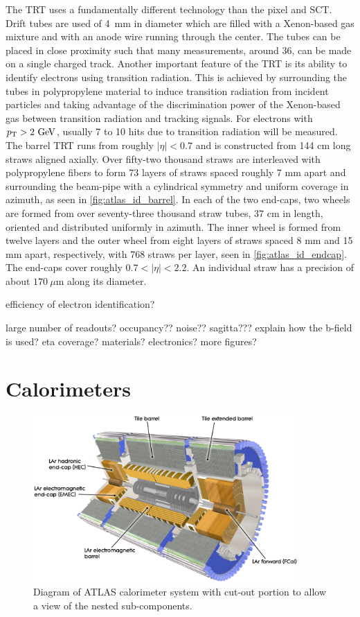 The TRT uses a fundamentally different technology 
than the pixel and SCT.
Drift tubes are used of 4~mm in diameter 
which are filled with a Xenon-based gas mixture
and with an anode wire running through the center.
The tubes can be placed in close
proximity such that many measurements, around 36,
can be made on a single charged track. Another important feature
of the TRT is its ability to identify electrons using transition radiation.
This is achieved by surrounding the tubes in polypropylene material to induce
transition radiation from incident particles and taking advantage
of the discrimination power of the Xenon-based gas between 
transition radiation and tracking signals.
For electrons with $\pt>2\GeV$, usually 7 to 10 hits due to transition
radiation will be measured.
The barrel TRT runs from roughly $|\eta|<0.7$ and
is constructed from 144 cm long straws aligned
axially. Over fifty-two thousand straws are interleaved
with polypropylene fibers to form 73 layers of straws 
spaced roughly 7 mm apart and surrounding the beam-pipe with
a cylindrical symmetry and uniform coverage in azimuth,
as seen in \fig\ref{fig:atlas_id_barrel}.
In each of the two end-caps, two wheels are formed from over seventy-three
thousand straw tubes, 37 cm in length, 
oriented and distributed uniformly in azimuth. 
The inner wheel is formed from twelve layers and the outer wheel from eight
layers of straws spaced 8 mm and 15 mm apart, respectively,  
with 768 straws per layer, seen in \fig\ref{fig:atlas_id_endcap}.
The end-caps cover roughly $0.7<|\eta|<2.2$.
An individual straw has a precision of about $170~\mu\textrm{m}$ along
its diameter.




efficiency of electron identification?


large number of readouts?
occupancy??
noise??
sagitta???
explain how the b-field is used?
eta coverage?
materials?
electronics?
more figures?



\section{Calorimeters }
\begin{figure}[ht!]
\centering
\includegraphics[width=0.9\textwidth]{figures/atlas/calorimeter.eps}
\caption{Diagram of ATLAS calorimeter system with cut-out portion
to allow a view of the nested sub-components.}
\label{fig:atlas_calorimeter}
\end{figure}


